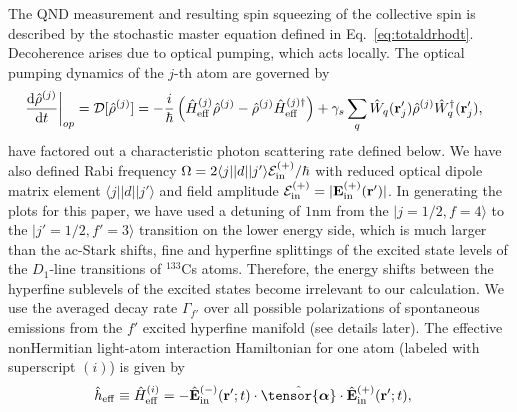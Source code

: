 \documentclass[preprint,aps,pra,onecolumn,superscriptaddress]{revtex4-1} %
\newcommand{\dt}[1]{\frac{{\mathrm d} {#1}}{{\mathrm d}t}}
\def\br{\mathbf{r}}
\def\bra#1{\langle{#1}\rvert}%
\def\ket#1{\lvert{#1}\rangle}%
\newcommand{\poltens}{\hat{\tensor{\boldsymbol{\alpha}}}}
\begin{document}
\begin{appendix}
The QND measurement and resulting spin squeezing of the collective spin is described by the stochastic master equation defined in Eq.~\eqref{eq:totaldrhodt}. Decoherence arises due to optical pumping, which acts locally.  The optical pumping dynamics of the $ j $-th atom are governed by
\begin{align}\label{eq:op_master}
\left.\dt{\hat{\rho}^{(j)}}\right|_{op} &= \mathcal{D}[\hat{\rho}^{(j)}]=-\frac{i}{\hbar}\left(\hat{H}_{\rm eff}^{(j)}\hat{\rho}^{(j)} -\hat{\rho}^{(j)}\hat{H}_{\rm eff}^{(j)\dagger} \right) + \gamma_s\sum_{q}\hat{W}_q(\br'_j)\hat{\rho}^{(j)}\hat{W}_q^\dagger(\br'_j), %
\end{align} 
have factored out a characteristic photon scattering rate defined below.
We have also defined Rabi frequency $ \Omega=2\bra{j}|d|\ket{j'}\mathcal{E}^{(+)}_{\rm in}/\hbar $ with reduced optical dipole matrix element $\bra{j}|d|\ket{j'}$ and field amplitude $ \mathcal{E}^{(+)}_{\rm in}=|\mathbf{E}_{\rm in}^{(+)}(\br')| $.
In generating the plots for this paper, we have used a detuning of $1$nm from the $ \ket{j=1/2,f=4} $ to the $ \ket{j'=1/2,f'=3} $ transition on the lower energy side, which is much larger than the ac-Stark shifts, fine and hyperfine splittings of the excited state levels of the $ D_1 $-line transitions of $ ^{133} $Cs atoms. Therefore, the energy shifts between the hyperfine sublevels of the excited states become irrelevant to our calculation. 
We use the averaged decay rate $ \Gamma_{f'} $ over all possible polarizations of spontaneous emissions from the $ f' $ excited hyperfine manifold (see details later). 
The effective nonHermitian light-atom interaction Hamiltonian for one atom (labeled with superscript $ (i) $) is given by
\begin{align}
\hat{h}_{\rm eff}\equiv \hat{H}_{\rm eff}^{(i)} &= - \hat{\mathbf{E}}^{(-)}_{\rm in}(\mathbf{r}' ; t ) \cdot \poltens \cdot \hat{\mathbf{E}}^{(+)}_{\rm in}(\mathbf{r}' ;t ),

\end{align}
\end{appendix}
\end{document}

